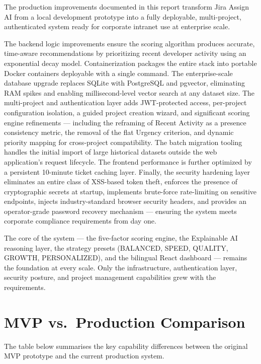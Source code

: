 \documentclass[12pt, a4paper]{article}
\begin{document}
The production improvements documented in this report transform Jira Assign AI from a local development prototype into a fully deployable, multi-project, authenticated system ready for corporate intranet use at enterprise scale.

The backend logic improvements ensure the scoring algorithm produces accurate, time-aware recommendations by prioritizing recent developer activity using an exponential decay model. Containerization packages the entire stack into portable Docker containers deployable with a single command. The enterprise-scale database upgrade replaces SQLite with PostgreSQL and pgvector, eliminating RAM spikes and enabling millisecond-level vector search at any dataset size. The multi-project and authentication layer adds JWT-protected access, per-project configuration isolation, a guided project creation wizard, and significant scoring engine refinements — including the reframing of Recent Activity as a presence consistency metric, the removal of the flat Urgency criterion, and dynamic priority mapping for cross-project compatibility. The batch migration tooling handles the initial import of large historical datasets outside the web application's request lifecycle. The frontend performance is further optimized by a persistent 10-minute ticket caching layer. Finally, the security hardening layer eliminates an entire class of XSS-based token theft, enforces the presence of cryptographic secrets at startup, implements brute-force rate-limiting on sensitive endpoints, injects industry-standard browser security headers, and provides an operator-grade password recovery mechanism — ensuring the system meets corporate compliance requirements from day one.

The core of the system — the five-factor scoring engine, the Explainable AI reasoning layer, the strategy presets (BALANCED, SPEED, QUALITY, GROWTH, PERSONALIZED), and the bilingual React dashboard — remains the foundation at every scale. Only the infrastructure, authentication layer, security posture, and project management capabilities grew with the requirements.


\appendix
\section{MVP vs.\ Production Comparison}

The table below summarises the key capability differences between the original MVP prototype and the current production system.
\end{document}
